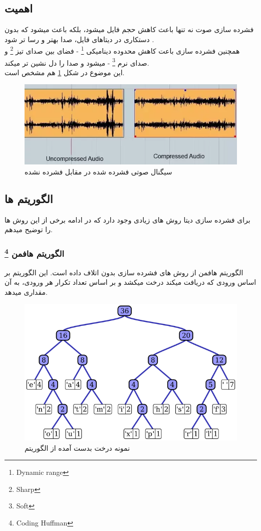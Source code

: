 \subsection{اهمیت}
فشرده سازی صوت نه تنها باعث کاهش حجم فایل میشود، بلکه باعث میشود که 
بدون دستکاری در دیتاهای فایل،
صدا بهتر و رسا تر شود .
\\
همچنین فشرده سازی باعت کاهش محدوده دینامیکی 
\footnote{Dynamic range}
- فضای بین صدای 
تیز 
\footnote{Sharp} 
و صدای 
نرم 
\footnote{Soft} 
-
میشود و صدا را دل نشین تر میکند.
\\
این موضوع در شکل 
\ref{fig:mesal4}
هم مشخص است.
\begin{figure}[H]
    \centering
    \includegraphics[width=0.5\linewidth]{images/comp-uncomp.png}
    \caption{سیگنال صوتی فشرده شده در مقابل فشرده نشده}
    \label{fig:mesal4}
\end{figure}

\subsection{الگوریتم ها}
برای فشرده سازی دیتا روش های زیادی وجود دارد که در ادامه برخی از این روش ها را توضیح میدهم.
\subsubsection{الگوریتم هافمن \footnote{Coding Huffman}}
الگوریتم هافمن از روش های فشرده سازی بدون اتلاف داده است.
این الگوریتم بر اساس ورودی که دریافت میکند درخت میکشد و بر اساس تعداد تکرار هر ورودی، به آن مقداری میدهد.
\begin{figure}[H]
    \centering
    \includegraphics[width=0.5\linewidth]{images/Huffman_tree_2.png}
    \caption{نمونه درخت بدست آمده از الگوریتم}
    \label{fig:mesal40}
\end{figure}

